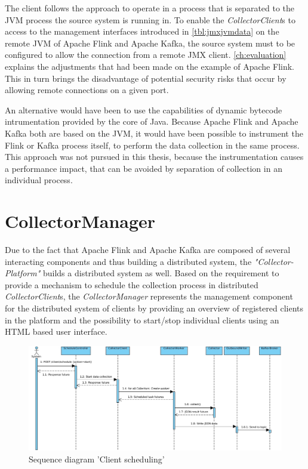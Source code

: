 The client follows the approach to operate in a process that is separated to the JVM process the source system is running in.
To enable the \textit{CollectorClient}s to access to the management interfaces introduced in \autoref{tbl:jmxjvmdata} on the remote JVM
of Apache Flink and Apache Kafka, the source system must to be configured to allow the connection from a remote JMX client. \autoref{ch:evaluation}
explains the adjustments that had been made on the example of Apache Flink. This in turn brings the disadvantage of potential
security risks that occur by allowing remote connections on a given port.

An alternative would have been to use the capabilities of dynamic bytecode intrumentation provided by the core of Java. Because
Apache Flink and Apache Kafka both are based on the JVM, it would have been possible to instrument the Flink or Kafka process itself,
to perform the data collection in the same process. This approach was not pursued in this thesis, because the instrumentation causes
a performance impact, that can be avoided by separation of collection in an individual process.

\section{CollectorManager}
\label{sec:arch-collector-manager}
Due to the fact that Apache Flink and Apache Kafka are composed of several interacting components and thus building
a distributed system, the \textit{"Collector-Platform"} builds a distributed system as well. Based on the requirement to provide a
mechanism to schedule the collection process in distributed \textit{CollectorClient}s, the \textit{CollectorManager} represents the management
component for the distributed system of clients by providing an overview of registered clients in the platform and
the possibility to start/stop individual clients using an HTML based user interface.

\begin{figure}[H]
 	\centering
 	\includegraphics[width=1.0\textwidth]{../uml/sequence-scheduling.jpg}
 	\caption{Sequence diagram 'Client scheduling'}
 	\label{fig:sequence-client-scheduling}
 \end{figure}

